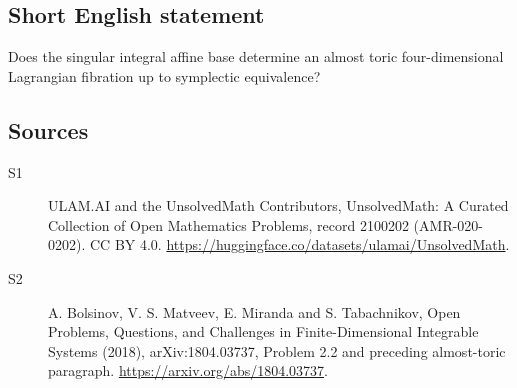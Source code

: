\documentclass[11pt]{article}
\begin{document}
\subsection{Short English statement}
Does the singular integral affine base determine an almost toric four-dimensional Lagrangian fibration up to symplectic equivalence?
\subsection{Sources}
\begin{description}
\item[\hypertarget{source:2100202:1}{S1}] ULAM.AI and the UnsolvedMath Contributors, UnsolvedMath: A Curated Collection of Open Mathematics Problems, record 2100202 (AMR-020-0202). CC BY 4.0. \url{https://huggingface.co/datasets/ulamai/UnsolvedMath}.
\item[\hypertarget{source:2100202:2}{S2}] A. Bolsinov, V. S. Matveev, E. Miranda and S. Tabachnikov, Open Problems, Questions, and Challenges in Finite-Dimensional Integrable Systems (2018), arXiv:1804.03737, Problem 2.2 and preceding almost-toric paragraph. \url{https://arxiv.org/abs/1804.03737}.
\end{description}
\label{end:2100202}
\end{document}
